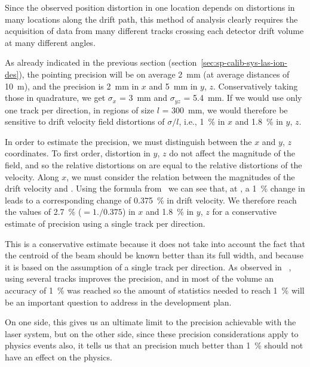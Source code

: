 Since the observed position distortion in one location depends on \efield distortions in many locations along the drift path, this method of analysis clearly requires the acquisition of data from many different tracks crossing each detector drift volume at many different angles. 

As already indicated in the previous section (section~\ref{sec:sp-calib-sys-las-ion-des}), the pointing precision will be on average \SI{2}{\milli\m} (at average distances of \SI{10}{\m}), and the  precision is \SI{2}{\milli\m} in $x$ and \SI{5}{\milli\m} in $y$, $z$. Conservatively taking those in quadrature, we get $\sigma_x$ =  \SI{3}{\milli\m} and $\sigma_{yz}$ = \SI{5.4}{\milli\m}.
If we would use only one track per direction, in regions of size $l$ = \SI{300}{\milli\m}, we would therefore be sensitive to drift velocity field distortions of $\sigma /l$, i.e., \SI{1}{\%} in $x$ and \SI{1.8}{\%} in $y$, $z$. 

In order to estimate the \efield precision, we must distinguish between the $x$ and $y$, $z$ coordinates. To first order, distortion in $y$, $z$ do not affect the magnitude of the field, and so the relative distortions on \efield are equal to the relative distortions of the velocity. Along $x$, we must consider the relation between the magnitudes of the drift velocity and \efield. Using the formula from~\cite{Li:2015rqa,Walkowiak:2000wf} we can see that, at \spmaxfield, a \SI{1}{\%} change in \efield leads to a corresponding change of \SI{0.375}{\%} in drift velocity. We therefore reach the values of \SI{2.7}{\%} ($=1./0.375$) in $x$ and \SI{1.8}{\%} in $y$, $z$ for a conservative estimate of \efield precision using a single track per direction. 

This is a conservative estimate because it does not take into account the fact that the centroid of the beam should be known better than its full width, and because it is based on the assumption of a single track per direction.  
As observed in ~\cite{bib:uBlaser2019}, using several tracks improves the precision, and in most of the volume an accuracy of \SI{1}{\%} was reached so the amount of statistics needed to reach \SI{1}{\%} will be an important question to address in the development plan. 



On one side, this gives us an ultimate limit to the \efield precision achievable with the laser system, but on the other side, since these  precision considerations apply to physics events also, it tells us that an \efield precision much better than \SI{1}{\%} should not have an effect on the physics.



